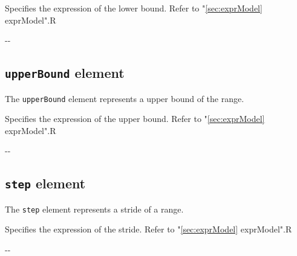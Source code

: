 \begin{XcodeMLChildElements}
{Specifies the expression of the lower bound. Refer to "\ref{sec:exprModel} exprModel".}{R}
\end{XcodeMLChildElements}

\begin{XcodeMLAttributes}
\XcodeMLAttrDef{-}{-}
{-}{-}
\end{XcodeMLAttributes}


\subsection{ {\tt upperBound} element}

The {\tt upperBound} element represents a upper bound of the range.


\begin{XcodeMLChildElements}
{Specifies the expression of the upper bound. Refer to "\ref{sec:exprModel} exprModel".}{R}
\end{XcodeMLChildElements}

\begin{XcodeMLAttributes}
\XcodeMLAttrDef{-}{-}
{-}{-}
\end{XcodeMLAttributes}


\subsection{ {\tt step} element}

The {\tt step} element represents a stride of a range.


\begin{XcodeMLChildElements}
{Specifies the expression of the stride. Refer to "\ref{sec:exprModel} exprModel".}{R}
\end{XcodeMLChildElements}

\begin{XcodeMLAttributes}
\XcodeMLAttrDef{-}{-}
{-}{-}
\end{XcodeMLAttributes}


